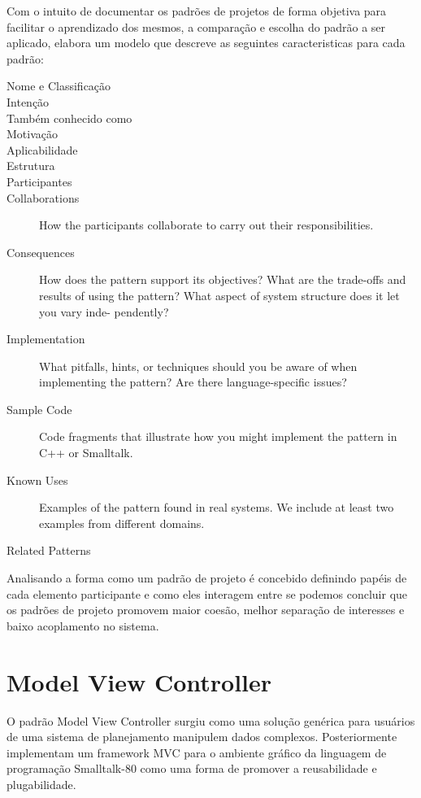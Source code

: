 Com o intuito de documentar os padrões de projetos de forma objetiva para
facilitar o aprendizado dos mesmos, a comparação e escolha do padrão a ser
aplicado,  elabora um modelo que descreve as seguintes
caracteristicas para cada padrão:

\begin{description}
\item[Nome e Classificação]
\item[Intenção]
\item[Também conhecido como]
\item[Motivação]
\item[Aplicabilidade]
\item[Estrutura]
\item[Participantes]
\item[Collaborations]
How the participants collaborate to carry out their responsibilities.
\item[Consequences]
How does the pattern support its objectives? What are the trade-offs and results
of using the pattern? What aspect of system structure does it let you vary inde-
pendently?
\item[Implementation]
What pitfalls, hints, or techniques should you be aware of when implementing
the pattern? Are there language-specific issues?
\item[Sample Code]
Code fragments that illustrate how you might implement the pattern in C++ or
Smalltalk.
\item[Known Uses]
Examples of the pattern found in real systems. We include at least two examples
from different domains.
\item[Related Patterns]
\end{description}

Analisando a forma como um padrão de projeto é concebido definindo papéis de
cada elemento participante e como eles interagem entre se podemos concluir que
os padrões de projeto promovem maior coesão, melhor separação de interesses e
baixo acoplamento no sistema.


\section{Model View Controller}

O padrão Model View Controller surgiu como uma solução genérica para usuários
de uma sistema de planejamento manipulem dados complexos.
Posteriormente  implementam um framework MVC para o
ambiente gráfico da linguagem de programação Smalltalk-80 como uma forma de
promover a reusabilidade e plugabilidade.

